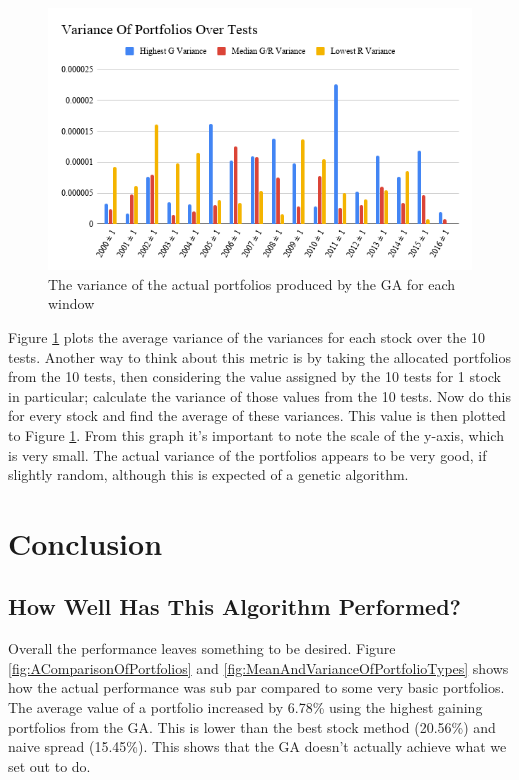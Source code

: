 \documentclass[11pt]{article}
\begin{document}
    \begin{figure}[H] %
        \includegraphics[width=\textwidth]{VarianceOfPortfoliosOverTests}
        \caption{The variance of the actual portfolios produced by the GA for each window}
            \label{fig:VarianceOfPortfoliosOverTests}
    \end{figure}

    Figure \ref{fig:VarianceOfPortfoliosOverTests} plots the average variance of the variances for
    each stock over the 10 tests. Another way to think about this metric is by taking the allocated
    portfolios from the 10 tests, then considering the value assigned by the 10 tests for 1 stock in
    particular; calculate the variance of those values from the 10 tests. Now do this for every stock and find the
    average of these variances. This value is then plotted to Figure
    \ref{fig:VarianceOfPortfoliosOverTests}. From this graph it's important to note the scale of
    the y-axis, which is very small. The actual variance of the portfolios appears to be very
    good, if slightly random, although this is expected of a genetic algorithm.

\section{Conclusion}

\subsection{How Well Has This Algorithm Performed?}

    Overall the performance leaves something to be desired. Figure
    \ref{fig:AComparisonOfPortfolios} and \ref{fig:MeanAndVarianceOfPortfolioTypes}
    shows how the actual performance was
    sub par compared to some very basic portfolios. The average value of a portfolio
    increased by 6.78\% using the highest gaining portfolios from the GA. This is lower
    than the best stock method (20.56\%) and naive spread (15.45\%). This shows
    that the GA doesn't actually achieve what we set out to do.
\end{document}

